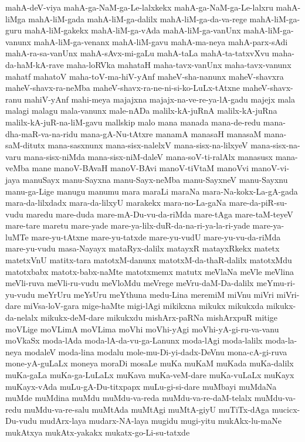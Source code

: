 {mahA-deV-viya
mahA-ga-NaM-ga-Le-lalxkekx
mahA-ga-NaM-ga-Le-lalxru
mahA-liMga
mahA-liM-gada
mahA-liM-ga-dalilx
mahA-liM-ga-da-va-rege
mahA-liM-ga-guru
mahA-liM-gakekx
mahA-liM-ga-vAda
mahA-liM-ga-vanUnx
mahA-liM-ga-vanunx
mahA-liM-ga-venanx
mahA-liM-gavu
mahA-ma-neya
mahA-parx-sAdi
mahA-ra-sa-vanUnx
mahA-sAvx-mi-gaLu
mahA-taLa
mahA-ta-tatxvXvu
maha-da-haM-kA-rave
maha-loRVka
mahataH
maha-tavx-vanUnx
maha-tavx-vanunx
mahatf
mahatoV
maha-toV-ma-hiV-yAnf
maheV-sha-nanunx
maheV-shavxra
maheV-shavx-ra-neMba
maheV-shavx-ra-ne-ni-si-ko-LuLx-tAtxne
maheV-shavx-ranu
mahiV-yAnf
mahi-meya
majajxna
majajx-na-ve-re-ya-lA-gadu
majejx
mala
malagi
malagu
mala-vanunx
male-nADa
malilx-kA-juRnA
malilx-kA-juRna
malilx-kA-juR-na-liM-gavu
mallskip
malo
mana
manada
mana-de-redu
mana-dha-maR-va-na-ridu
mana-gA-Nu-tAtxre
manamA
manasaH
manasaM
mana-saM-ditutx
mana-sasxnunx
mana-sisx-nalelxV
mana-sisx-na-lilxyeV
mana-sisx-na-varu
mana-sisx-niMda
mana-sisx-niM-daleV
mana-soV-ti-ralAlx
manasusx
mana-veMba
mane
manoV-BAvaH
manoV-BAvi
manoV-tiVtaM
manoVvi
manoV-vi-jaya
manuSayx
manu-Sayxna
manu-Sayx-neMba
manu-SayxneV
manu-Sayxnu
manu-ga-Lige
manugu
manumu
mara
maraLi
maraNa
mara-Na-kokx-La-gA-gada
mara-da-lilxdadx
mara-da-lilxyU
marakekx
mara-no-La-gaNa
mare-da-piR-su-vudu
maredu
mare-duda
mare-mA-Du-vu-da-riMda
mare-tAga
mare-taM-teyeV
mare-tare
maretu
mare-yade
mare-ya-lilx-duR-da-na-ri-ya-la-ri-yade
mare-ya-luMTe
mare-yu-tAtxne
mare-yu-tatxde
mare-yu-vudU
mare-yu-vu-da-riMda
mare-yu-vudu
masa-Nayayx
mataRyx-dalilx
matayxR
matayxRkekx
matetx
matetxVnU
matitx-tara
matotxM-danunx
matotxM-da-thaR-dalilx
matotxMdu
matotxbabx
matotx-babx-naMte
matotxmemx
matutx
meVlaNa
meVle
meVlina
meVli-ruva
meVli-ru-vudu
meVloMdu
meVrege
meVru-daM-Da-dalilx
meYmu-ri-yu-vudu
meYrUru
meYsUru
meYthuna
medu-Lina
meremiM
miVnu
miVri
miVri-dare
miVsa-loV-gara
mige-haMte
migi-lAgi
mikikxna
mikukx
mikukxda
mikukx-da-nelalx
mikukx-deM-dare
mikukxdu
mishArx-paRNa
mishArxpuR
mitige
moVLige
moVLimA
moVLima
moVhi
moVhi-yAgi
moVhi-yA-gi-ru-va-vanu
moVkaSx
moda-lAda
moda-lA-da-vu-ga-Lanunx
moda-lAgi
moda-lalilx
moda-la-neya
modaleV
moda-lina
modalu
mole-mu-Di-yi-dadx-DeVnu
mona-cA-gi-ruva
mone-yA-guLaLx
moneya
moraDi
mosaLe
muKa
muKaM
muKada
muKa-dalilx
muKa-gaLa
muKa-ga-LuLaLx
muKava
muKa-veM-dare
muKa-vuLaLx
muKayx
muKayx-vAda
muLu-gA-Du-titxpapx
muLu-gi-si-dare
muMbayi
muMdaNa
muMde
muMdina
muMdu
muMdu-va-reda
muMdu-va-re-daM-telalx
muMdu-va-redu
muMdu-va-re-salu
muMtAda
muMtAgi
muMtA-giyU
muTiTx-dAga
mucicx-Du-vudu
mudArx-laya
mudarx-NA-laya
mugidu
mugi-yitu
mukAkx-lu-maNe
mukAtxya
mukAtx-yakakx
mukatx-go-Li-su-tatxde
}
